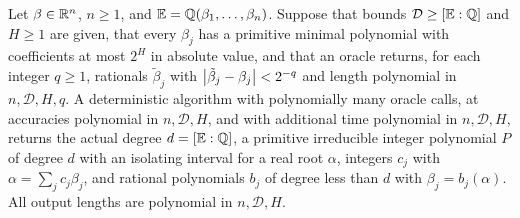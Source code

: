 \begin{theorem}
\label{thm:qc-recovery}
Let $\beta\in\mathbb R^n$, $n\ge1$, and $\mathbb E=\mathbb Q(\beta_1,\ldots,\beta_n)$. Suppose
that bounds $\mathcal D\ge[\mathbb E:\mathbb Q]$ and $H\ge1$ are given, that every
$\beta_j$ has a primitive minimal polynomial with coefficients at most $2^H$
in absolute value, and that an oracle returns, for each integer $q\ge1$,
rationals $\tilde\beta_j$ with $\left\lvert\tilde\beta_j-\beta_j\right\rvert<2^{-q}$ and length
polynomial in $n,\mathcal D,H,q$. A deterministic algorithm with polynomially
many oracle calls, at accuracies polynomial in $n,\mathcal D,H$, and with
additional time polynomial in $n,\mathcal D,H$, returns the actual degree
$d=[\mathbb E:\mathbb Q]$, a primitive irreducible integer polynomial $P$ of degree
$d$ with an isolating interval for a real root $\alpha$, integers $c_j$ with
$\alpha=\sum_jc_j\beta_j$, and rational polynomials $b_j$ of degree less than
$d$ with $\beta_j=b_j(\alpha)$. All output lengths are polynomial in
$n,\mathcal D,H$.
\end{theorem}

